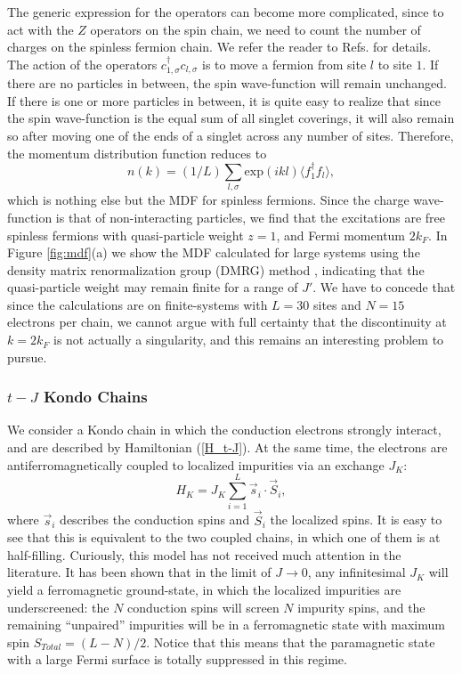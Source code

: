 \documentclass[article,11pt]{revtex4}
\begin{document}
The generic expression for the operators can become more complicated, since to act with the $Z$ operators on the spin chain, we need to count the number of charges on the spinless fermion chain. We refer the reader to Refs. for details. The action of the operators $c^\dagger_{1,\sigma}c_{l,\sigma}$ is to move a fermion from site $l$ to site $1$. If there are no particles in between, the spin wave-function will remain unchanged. If there is one or more particles in between, it is quite easy to realize that since the spin wave-function is the equal sum of all singlet coverings, it will also remain so after moving one of the ends of a singlet across any number of sites. Therefore, the momentum distribution function reduces to 
\begin{equation}
n(k) = (1/L)\sum_{l,\sigma} \mbox{exp}(ikl)\langle f^\dagger_{1}f_{l}\rangle,
\label{nkb}
\end{equation}
which is nothing else but the MDF for spinless fermions. Since the charge wave-function is that of non-interacting particles, we find that the excitations are free spinless fermions with quasi-particle weight $z=1$, and Fermi momentum $2k_F$. 
In Figure \ref{fig:mdf}(a) we show the MDF calculated for large systems using the density matrix renormalization group (DMRG) method \cite{White1992,White1993}, indicating that the quasi-particle weight may remain finite for a range of $J'$. We have to concede that since the calculations are on finite-systems with $L=30$ sites and $N=15$ electrons per chain, we cannot argue with full certainty that the discontinuity at $k=2k_F$ is not actually a singularity, and this remains an interesting problem to pursue. 

\subsubsection {$t-J$ Kondo Chains}

We consider a Kondo chain in which the conduction electrons strongly interact, and are described by Hamiltonian (\ref{H_t-J}). At the same time, the electrons are antiferromagnetically coupled to localized impurities via an exchange $J_K$:
\begin{equation}
H_K=J_K \sum_{i=1}^L \vec{s}_i \cdot \vec{S}_{i},
\label{fullH}
\end{equation}
where  $\vec{s}_i$ describes the conduction spins  and $\vec{S}_i$ the localized spins. It is easy to see that this is equivalent to the two coupled chains, in which one of them is at half-filling. Curiously, this model has not received much attention in the literature. It has been shown that in the limit of $J\rightarrow0$, any infinitesimal $J_K$ will yield a ferromagnetic ground-state\cite{Yanagisawa1994}, in which the localized impurities are underscreened: the $N$ conduction spins will screen $N$ impurity spins, and the remaining ``unpaired'' impurities will be in a ferromagnetic state with maximum spin $S_{Total}=(L-N)/2$. Notice that this means that the paramagnetic state with a large Fermi surface is totally suppressed in this regime. 
\end{document}
